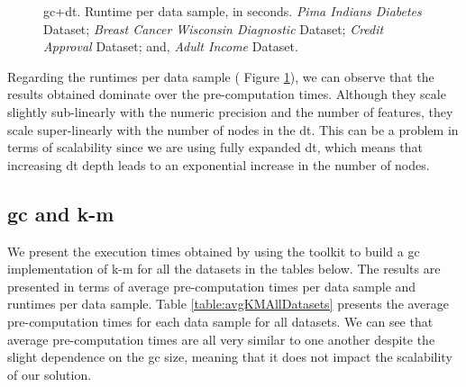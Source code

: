 \begin{figure}[hpt]
\caption[\acs{gc}+\acs{dt}. Runtime per data sample, in seconds. All datasets.]{\acs{gc}+\acs{dt}. Runtime per data sample, in seconds.
 \emph{Pima Indians Diabetes} Dataset;
 \emph{Breast Cancer Wisconsin Diagnostic} Dataset;
 \emph{Credit Approval} Dataset; and,
 \emph{Adult Income} Dataset.}%
\label{fig:dt-gc}%
\end{figure}


Regarding the runtimes per data sample (
Figure \ref{fig:dt-gc}), we can observe that the results obtained dominate over the pre-computation times. Although they scale slightly sub-linearly with the numeric precision and the number of features, they scale super-linearly with the number of nodes in the \ac{dt}. This can be a problem in terms of scalability since we are using fully expanded \ac{dt}, which means that increasing \ac{dt} depth leads to an exponential increase in the number of nodes.


\subsection{\acl{gc} and \acl{k-m}}
\label{ssec:gcandKM}


We present the execution times obtained by using the toolkit to build a \ac{gc} implementation of \ac{k-m} for all the datasets in the tables below. The results are presented in terms of average pre-computation times per data sample and runtimes per data sample. Table \ref{table:avgKMAllDatasets} presents the average pre-computation times for each data sample for all datasets. We can see that average pre-computation times are all very similar to one another despite the slight dependence on the \ac{gc} size, meaning that it does not impact the scalability of our solution.


